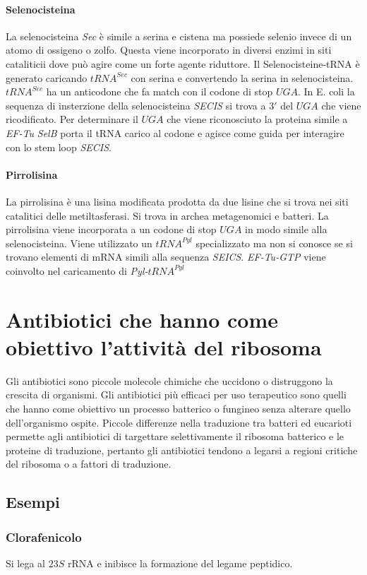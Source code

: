 \paragraph{Selenocisteina}
La selenocisteina \emph{Sec} \`e simile a serina e cistena ma possiede selenio invece di un atomo di ossigeno o zolfo. Questa viene incorporato in diversi enzimi in siti cataliticii 
dove pu\`o agire come un forte agente riduttore. Il Selenocisteine-tRNA \`e generato caricando \emph{$tRNA^{Sec}$} con serina e convertendo la serina in selenocisteina. 
\emph{$tRNA^{Sec}$} ha un anticodone che fa match con il codone di stop $UGA$. In E. coli la sequenza di insterzione della selenocisteina \emph{SECIS} si trova a $3'$ del $UGA$ che viene 
ricodificato. Per determinare il $UGA$ che viene riconosciuto la proteina simile a \emph{EF-Tu} \emph{SelB} porta il tRNA carico al codone e agisce come guida per interagire con lo stem 
loop \emph{SECIS}. 
\paragraph{Pirrolisina}
La pirrolisina \`e una lisina modificata prodotta da due lisine che si trova nei siti catalitici delle metiltasferasi. Si trova in archea metagenomici e batteri. La pirrolisina viene
incorporata a un codone di stop $UGA$ in modo simile alla selenocisteina. Viene utilizzato un \emph{$tRNA^{Pyl}$} specializzato ma non si conosce se si trovano elementi di mRNA simili
alla sequenza \emph{SEICS}. \emph{EF-Tu-GTP} viene coinvolto nel caricamento di \emph{Pyl-$tRNA^{Pyl}$}
\section{Antibiotici che hanno come obiettivo l'attivit\`a del ribosoma}
Gli antibiotici sono piccole molecole chimiche che uccidono o distruggono la crescita di organismi. Gli antibiotici pi\`u efficaci per uso terapeutico sono quelli che hanno
come obiettivo un processo batterico o fungineo senza alterare quello dell'organismo ospite. Piccole differenze nella traduzione tra batteri ed eucarioti permette agli antibiotici di targettare 
selettivamente il ribosoma batterico e le proteine di traduzione, pertanto gli antibiotici tendono a legarsi a regioni critiche del ribosoma o a fattori di traduzione. 
\subsection{Esempi}
\subsubsection{Clorafenicolo}
Si lega al $23S$ rRNA e inibisce la formazione del legame peptidico. 
